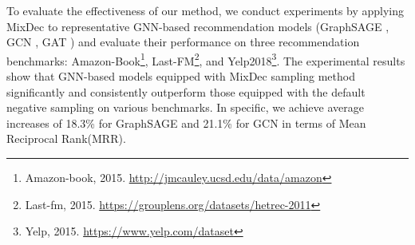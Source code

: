 

To evaluate the effectiveness of our method, we conduct experiments by applying MixDec to representative GNN-based recommendation models (\eg GraphSAGE \cite{graphsage}, GCN \cite{gcn}, GAT \cite{gat}) and evaluate their performance on three recommendation benchmarks: Amazon-Book\footnote{Amazon-book, 2015. \url{http://jmcauley.ucsd.edu/data/amazon}}, Last-FM\footnote{Last-fm, 2015. \url{https://grouplens.org/datasets/hetrec-2011}}, and Yelp2018\footnote{Yelp, 2015. \url{https://www.yelp.com/dataset}}. 
The experimental results show that GNN-based models equipped with MixDec sampling method significantly and consistently outperform those equipped with the default negative sampling on various benchmarks.
In specific, we achieve average increases of 18.3\% for GraphSAGE and 21.1\% for GCN in terms of Mean Reciprocal Rank(MRR).


